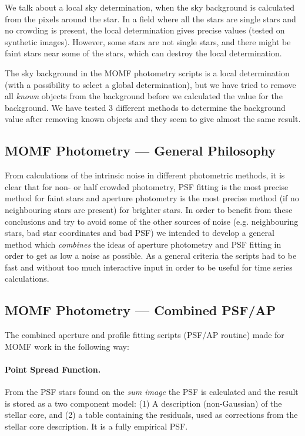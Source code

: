\documentclass[]{article}
\begin{document}
We talk about a
local sky determination, when the sky background is calculated 
from the pixels around the star. In a field where all the stars are
single stars and no crowding is present, the local determination gives 
precise
values (tested on synthetic images). However, some stars are not 
single
stars, and there might be faint stars near some of the stars, which
can destroy the local determination.
 
The sky background in the MOMF photometry scripts is a
local determination (with a possibility to select a global
determination), but we have tried to
remove all {\em known} objects from the
background before we calculated the value for the background.
We have tested
3 different methods to determine the background value after
removing known objects and
they seem to give almost the same result. 
 
\subsection{MOMF Photometry --- General Philosophy}
From calculations of the intrinsic noise in different photometric
methods,
it is clear that
for non- or half crowded photometry, PSF fitting is the most precise
method for faint stars and aperture photometry is the most
precise method (if no neighbouring stars are present) for brighter 
stars.
In order to benefit from these conclusions and try to avoid some of 
the
other sources of noise (e.g. neighbouring stars, bad star coordinates 
and
bad PSF) we intended to develop a general method which {\em 
combines}
the ideas of aperture photometry and PSF fitting in order to
get as low a noise as possible. As a general criteria the scripts had 
to
be fast and without too much
interactive input in order to be useful for time series calculations.



\subsection{MOMF Photometry --- Combined PSF/AP}
The combined aperture and profile fitting scripts (PSF/AP routine) 
made for MOMF work in the following way:
\paragraph{Point Spread Function.}
From the PSF stars found on the {\em sum image} the PSF is 
calculated and the result is stored as a two component model: (1) A 
description (non-Gaussian) of the stellar core, and (2) a table 
containing the residuals, used as corrections from the stellar core 
description. It is a fully empirical PSF.
\end{document}
